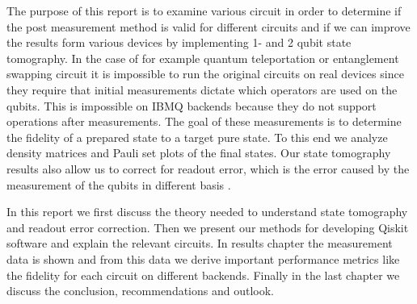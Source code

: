 The purpose of this report is to examine various circuit in order to determine
if the post measurement method is valid for different circuits and if we can
improve the results form various devices by implementing 1- and 2 qubit state
tomography. In the case of for example quantum teleportation or entanglement
swapping circuit it is impossible to run the original circuits on real devices
since they require that initial measurements dictate which operators are used on
the qubits. This is impossible on IBMQ backends because they do not support
operations after measurements. The goal of these measurements is to determine
the fidelity of a prepared state to a target pure state. To this end we analyze
density matrices and Pauli set plots of the final states. Our state tomography
results also allow us to correct for readout error, which is the error caused by
the measurement of the qubits in different basis \cite{nielsen10_quant}.

In this report we first discuss the theory needed to understand state tomography
and readout error correction. Then we present our methods for developing Qiskit
software and explain the relevant circuits. In results chapter the measurement
data is shown and from this data we derive important performance metrics like
the fidelity for each circuit on different backends. Finally in the last chapter
we discuss the conclusion, recommendations and outlook.

